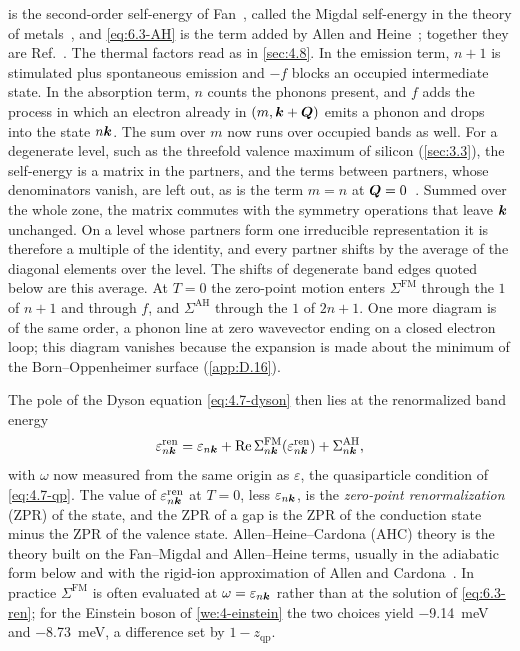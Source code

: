  is the second-order self-energy of Fan~\cite{fan1951temperature}, called the Migdal self-energy in the theory of metals~\cite{migdal1958interaction}, and \cref{eq:6.3-AH} is the term added by Allen and Heine~\cite{allen1976theory}; together they are Ref.~\cite[Eqs.~(157), (158), (160) and~(161)]{giustino2017electron}. The thermal factors read as in \cref{sec:4.8}. In the emission term, $n + 1$ is stimulated plus spontaneous emission and $-f$ blocks an occupied intermediate state. In the absorption term, $n$ counts the phonons present, and $f$ adds the process in which an electron already in $(m,\bm{k}+\bm{Q})$ emits a phonon and drops into the state $n\bm{k}$. The sum over $m$ now runs over occupied bands as well. For a degenerate level, such as the threefold valence maximum of silicon (\cref{sec:3.3}), the self-energy is a matrix in the partners, and the terms between partners, whose denominators vanish, are left out, as is the term $m = n$ at $\bm{Q} = 0$~\cite[Sect.~III\,A]{ponce2015temperature}. Summed over the whole zone, the matrix commutes with the symmetry operations that leave $\bm{k}$ unchanged. On a level whose partners form one irreducible representation it is therefore a multiple of the identity, and every partner shifts by the average of the diagonal elements over the level. The shifts of degenerate band edges quoted below are this average. At $T = 0$ the zero-point motion enters $\Sigma^{\mathrm{FM}}$ through the $1$ of $n + 1$ and through $f$, and $\Sigma^{\mathrm{AH}}$ through the $1$ of $2n + 1$. One more diagram is of the same order, a phonon line at zero wavevector ending on a closed electron loop; this diagram vanishes because the expansion is made about the minimum of the Born--Oppenheimer surface (\cref{app:D.16}).

The pole of the Dyson equation \cref{eq:4.7-dyson} then lies at the renormalized band energy
\begin{equation}
  \varepsilon^{\mathrm{ren}}_{n\bm{k}} = \varepsilon_{n\bm{k}} + \operatorname{Re}\Sigma^{\mathrm{FM}}_{n\bm{k}}(\varepsilon^{\mathrm{ren}}_{n\bm{k}}) + \Sigma^{\mathrm{AH}}_{n\bm{k}} ,
  \label{eq:6.3-ren}
\end{equation}
with $\omega$ now measured from the same origin as $\varepsilon$, the quasiparticle condition of \cref{eq:4.7-qp}. The value of $\varepsilon^{\mathrm{ren}}_{n\bm{k}}$ at $T = 0$, less $\varepsilon_{n\bm{k}}$, is the \emph{zero-point renormalization} (ZPR) of the state, and the ZPR of a gap is the ZPR of the conduction state minus the ZPR of the valence state. Allen--Heine--Cardona (AHC) theory is the theory built on the Fan--Migdal and Allen--Heine terms, usually in the adiabatic form below and with the rigid-ion approximation of Allen and Cardona~\cite{allen1981temperature}. In practice $\Sigma^{\mathrm{FM}}$ is often evaluated at $\omega = \varepsilon_{n\bm{k}}$ rather than at the solution of \cref{eq:6.3-ren}; for the Einstein boson of \cref{we:4-einstein} the two choices yield \SI{-9.14}{meV} and \SI{-8.73}{meV}, a difference set by $1 - z_{\mathrm{qp}}$.


